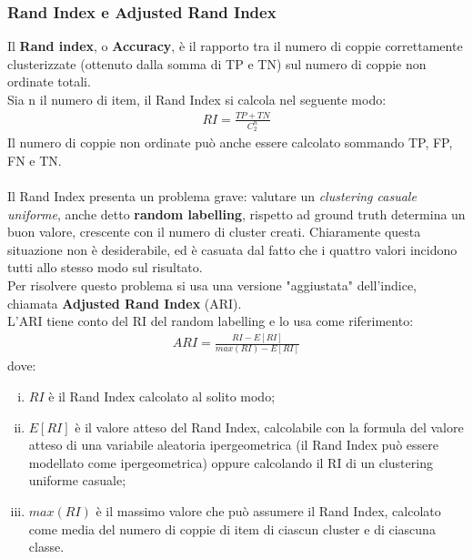 \subsubsection{Rand Index e Adjusted Rand Index}
Il \textbf{Rand index}, o \textbf{Accuracy}, è il rapporto tra il numero di coppie correttamente clusterizzate (ottenuto dalla somma di TP e TN) sul numero di coppie non ordinate totali.\\
Sia n il numero di item, il Rand Index si calcola nel seguente modo:
\begin{align}
	RI = \frac{TP + TN}{C_2^n}
\end{align}
Il numero di coppie non ordinate può anche essere calcolato sommando TP, FP, FN e TN.\\
\\
Il Rand Index presenta un problema grave: valutare un \textit{clustering casuale uniforme}, anche detto \textbf{random labelling}, rispetto ad ground truth determina un buon valore, crescente con il numero di cluster creati. Chiaramente questa situazione non è desiderabile, ed è casuata dal fatto che i quattro valori incidono tutti allo stesso modo sul risultato.\\
Per risolvere questo problema si usa una versione "aggiustata" dell'indice, chiamata \textbf{Adjusted Rand Index} (ARI)\cite{ari}.\\
L'ARI tiene conto del RI del random labelling e lo usa come riferimento:
\begin{align}
	ARI = \frac{RI - E[RI]}{max(RI) - E[RI]}
\end{align}
dove:
\begin{enumerate}[(i)]
	\item $ RI $ è il Rand Index calcolato al solito modo;
	\item $ E[RI] $ è il valore atteso del Rand Index, calcolabile con la formula del valore atteso di una variabile aleatoria ipergeometrica (il Rand Index può essere modellato come ipergeometrica) oppure calcolando il RI di un clustering uniforme casuale;
	\item $ max(RI) $ è il massimo valore che può assumere il Rand Index, calcolato come media del numero di coppie di item di ciascun cluster e di ciascuna classe.
\end{enumerate}

